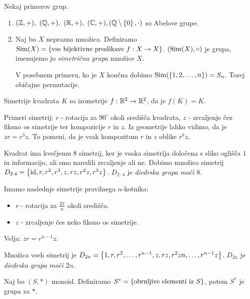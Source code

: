 \begin{zgled}
    Nekaj primerov grup.
    \begin{enumerate}
        \item $(\mathbb{Z}, +), \ (\mathbb{Q}, +), \ (\mathbb{R}, +), \ (\mathbb{C}, +), (\mathbb{Q} \setminus \left\{0\right\}, \cdot)$ so Abelove grupe.
        \item Naj bo $X$ neprazna množica. Definiramo $\operatorname{Sim}(X) = \left\{\text{vse bijektivne preslikave } f: X \to X\right\}$. $(\operatorname{Sim}(X), \circ)$ je grupa, imenujemo jo \emph{simetrična grupa} množice $X$.        
        
        V posebnem primeru, ko je $X$ končna dobimo $\operatorname{Sim}(\left\{1, 2, \ldots, n\right\}) = S_n$. Torej običajne permutacije.
    \end{enumerate}
\end{zgled}

\begin{zgled}
    Simetrije kvadrata $K$ so izometrije $f: \mathbb{R}^2 \to \mathbb{R}^2$, da je $f(K) = K$. 
    
    Primeri simetrij: $r$ - rotacija za $90^{\circ}$ okoli središča kvadrata, $z$ - zrcaljenje čez fiksno os simetrije ter kompozicije $r$ in $z$. Iz geometrije lahko vidimo, da je $zr = r^3z$. To pomeni, da je vsak kompozitum $r$ in $z$ oblike $r^kz$.
    
    Kvadrat ima kvečjemu $8$ simetrij, ker je vsaka simetrija določena s sliko oglišča $1$ in informacijo, ali smo naredili zrcaljenje ali ne. Dobimo množico simetrij $D_{2 \cdot 4} = \left\{\operatorname{id}, r, r^2, r^3, z, rz, r^2z, r^3z\right\}$. $D_{2\cdot 4}$ je \emph{diedrska grupa moči $8$}.
\end{zgled}

\begin{zgled}
    Imamo naslednje simetrije pravilnega $n$-kotnika:
    \begin{itemize}
        \item $r$ - rotacija za $\frac{2 \pi}{n}$ okoli središča.
        \item $z$ - zrcaljenje čes neko fiksno os simetrije.
    \end{itemize}
    Velja: $zr = r^{n-1}z$. 
    
    Množica vseh simetrij je $D_{2n} = \left\{1, r, r^2, \ldots, r^{n-1}, z, rz, r^2zn, \ldots, r^{n-1}z\right\}$. $D_{2n}$ je \emph{diedrska grupa moči $2n$}.
\end{zgled}

\begin{zgled}
    Naj bo $(S, *)$ monoid. Definiramo $S^* = \left\{\text{obrnljive elementi iz } S\right\}$, potem $S^*$ je grupa za $*$.
\end{zgled}

